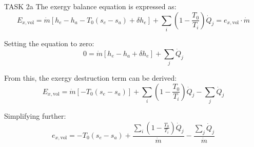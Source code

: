 TASK 2a  
The exergy balance equation is expressed as:  
\[
E_{x,\text{vol}} = \dot{m} \left[ h_e - h_a - T_0 (s_e - s_a) + \delta h_e \right] + \sum_i \left( 1 - \frac{T_0}{T_i} \right) \dot{Q}_j = e_{x,\text{vol}} \cdot \dot{m}
\]

Setting the equation to zero:  
\[
0 = \dot{m} \left[ h_e - h_a + \delta h_e \right] + \sum_j \dot{Q}_j
\]

From this, the exergy destruction term can be derived:  
\[
E_{x,\text{vol}} = \dot{m} \left[ -T_0 (s_e - s_a) \right] + \sum_i \left( 1 - \frac{T_0}{T_i} \right) \dot{Q}_j - \sum_j \dot{Q}_j
\]

Simplifying further:  
\[
e_{x,\text{vol}} = -T_0 (s_e - s_a) + \frac{\sum_i \left( 1 - \frac{T_0}{T_i} \right) \dot{Q}_j}{\dot{m}} - \frac{\sum_j \dot{Q}_j}{\dot{m}}
\]